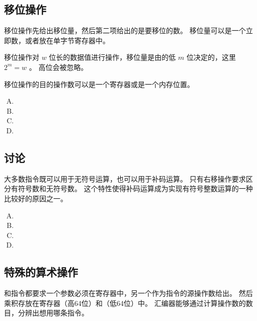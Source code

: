 {    \subsection{移位操作}
    {
        移位操作先给出移位量，然后第二项给出的是要移位的数。
        移位量可以是一个立即数，或者放在单字节寄存器中。

        移位操作对 $w$ 位长的数据值进行操作，移位量是由的低 $m$ 位决定的，这里 $2^m = w$ 。
        高位会被忽略。

        移位操作的目的操作数可以是一个寄存器或是一个内存位置。

        \begin{practicec}
            \begin{enumerate}[A.]
                \item {}
                \item {}
                \item {}
                \item {}
            \end{enumerate}
        \end{practicec}
    }

    \subsection{讨论}
    {
        大多数指令既可以用于无符号运算，也可以用于补码运算。
        只有右移操作要求区分有符号数和无符号数。
        这个特性使得补码运算成为实现有符号整数运算的一种比较好的原因之一。

        \begin{practicec}
            \begin{enumerate}[A.]
                \item {}
                \item {}
                \item {}
                \item {}
            \end{enumerate}
        \end{practicec}

        \begin{practicec}
        \end{practicec}
    }

    \subsection{特殊的算术操作}
    {
        和指令都要求一个参数必须在寄存器中，另一个作为指令的源操作数给出。
        然后乘积存放在寄存器（高64位）和（低64位）中。
        汇编器能够通过计算操作数的数目，分辨出想用哪条指令。

}}
